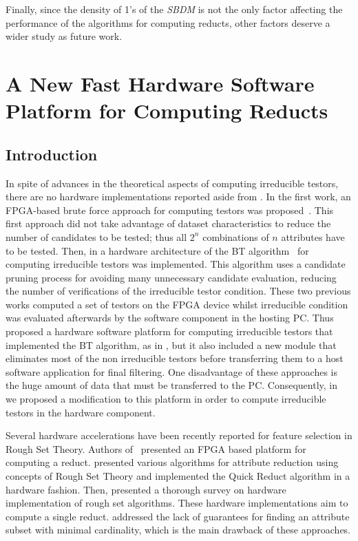 \documentclass[letterpaper, twoside, openright, 12pt]{book}%
\begin{document}
	Finally, since the density of 1's of the \textit{SBDM} is not the only factor affecting the performance of the algorithms for computing reducts, other factors deserve a wider study as future work.


			
\newpage 
%
\chapter[Hardware Implementation]{A New Fast Hardware Software Platform for Computing Reducts} \label{chap:FPGA} 
%

%
\section{Introduction}
%
	In spite of advances in the theoretical aspects of computing irreducible testors, there are no hardware implementations reported aside from \citep{Cumplido06,Rojas07,Rojas12}. In the first work, an FPGA-based brute force approach for computing testors was proposed~\citep{Cumplido06}. This first approach did not take advantage of dataset characteristics to reduce the number of candidates to be tested; thus all $2^n$ combinations of $n$ attributes have to be tested. Then, in \citep{Rojas07} a hardware architecture of the BT algorithm~\citep{Ruiz85} for computing irreducible testors was implemented. This algorithm uses a candidate pruning process for avoiding many unnecessary candidate evaluation, reducing the number of verifications of the irreducible testor condition. These two previous works computed a set of testors on the FPGA device whilst irreducible condition was evaluated afterwards by the software component in the hosting PC. Thus \cite{Rojas12} proposed a hardware software platform for computing irreducible testors that implemented the BT algorithm, as in \citep{Rojas07}, but it also included a new module that eliminates most of the non irreducible testors before transferring them to a host software application for final filtering. One disadvantage of these approaches is the huge amount of data that must be transferred to the PC. Consequently, in~\citep{Rodriguez14} we proposed a modification to this platform in order to compute irreducible testors in the hardware component. 
	
	Several hardware accelerations have been recently reported for feature selection in Rough Set Theory. Authors of~\citep{Grzes13,Kopczynski14} presented an FPGA based platform for computing a reduct. \cite{Tiwari13} presented various algorithms for attribute reduction using concepts of Rough Set Theory and implemented the Quick Reduct	algorithm in a hardware fashion. Then, \cite{Tiwari14} presented a thorough survey on hardware implementation of rough set algorithms. These hardware implementations aim to compute a single reduct. \cite{Jensen14} addressed the lack of guarantees for finding an attribute subset with minimal cardinality, which is the main drawback of these approaches. 
	
\end{document}
